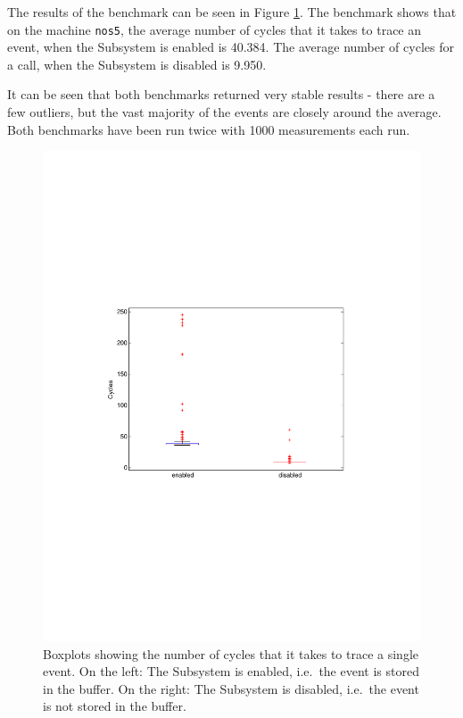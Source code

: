 \documentclass[a4paper,11pt,twoside]{report}
\begin{document}
The results of the benchmark can be seen in Figure \ref{fig:boxplot}. The
benchmark shows that on the machine \texttt{nos5}, the average number of cycles
that it takes to trace an event, when the Subsystem is enabled is 40.384. The
average number of cycles for a call, when the Subsystem is disabled is 9.950.

It can be seen that both benchmarks returned very stable results - there are a
few outliers, but the vast majority of the events are closely around the
average. Both benchmarks have been run twice with 1000 measurements each run.

\begin{figure}[htb]
	\includegraphics[width=1\textwidth]{images/boxplot.pdf}
	\caption{Boxplots showing the number of cycles that it takes to trace a
	single event. On the left: The Subsystem is enabled, i.e.~the event is
stored in the buffer. On the right: The Subsystem is disabled, i.e.~the event is
not stored in the buffer.}
	\label{fig:boxplot}
\end{figure}
\end{document}
